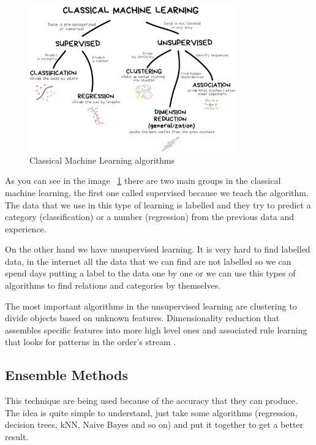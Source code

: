 \begin{figure}[H]
\centering
\includegraphics[width=0.8\textwidth]{./figures/classicalml}
\caption{Classical Machine Learning algorithms \cite{classicalmachinelearning}}
\label{fig:classicalml}
\end{figure}



As you can see in the image ~\ref{fig:classicalml} there are two main groups in the classical machine learning, the first one called supervised because we teach the algorithm. The data that we use in this type of learning is labelled and they try to predict a category (classification) or a number (regression) from the previous data and experience. 


On the other hand we have unsupervised learning. It is very hard to find labelled data, in the internet all the data that we can find are not labelled so we can spend days putting a label to the data one by one or we can use this types of algorithms to find relations and categories by themselves. 


The most important algorithms in the unsupervised learning are clustering to divide objects based on unknown features. Dimensionality reduction that assembles specific features into more high level ones and associated rule learning that looks for patterns in the order's stream \cite{classicalmachinelearning}.

\subsection[Ensemble Methods]{Ensemble Methods}

This technique are being used because of the accuracy that they can produce. The idea is quite simple to understand, just take some algorithms (regression, decision trees, kNN, Naive Bayes and so on) and put it together to get a better result. 

